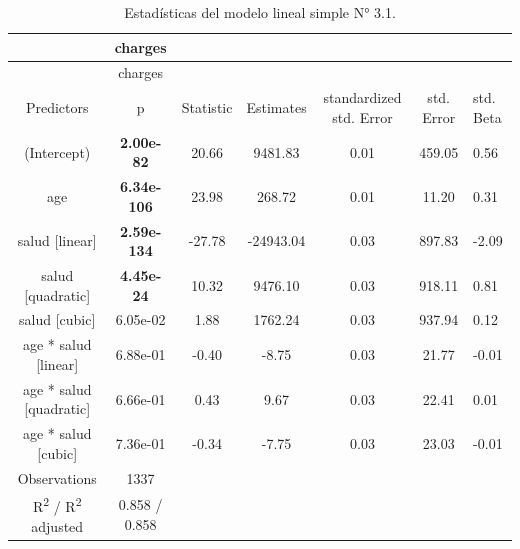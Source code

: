 \documentclass[
  letterpaper,
]{book}
\begin{document}
\hypertarget{tbl-stats_modelo3_simple}{}
\begin{longtable}[]{@{}ccccccl@{}}
\caption{\label{tbl-stats_modelo3_simple}Estadísticas del modelo lineal
simple N° 3.1.}\tabularnewline
\toprule()
~ & charges & & & & & \\
\midrule()
\endfirsthead
\toprule()
~ & charges & & & & & \\
\midrule()
\endhead
Predictors & p & Statistic & Estimates & standardized std. Error & std.
Error & std. Beta \\
(Intercept) & \textbf{2.00e-82} & 20.66 & 9481.83 & 0.01 & 459.05 &
0.56 \\
age & \textbf{6.34e-106} & 23.98 & 268.72 & 0.01 & 11.20 & 0.31 \\
salud {[}linear{]} & \textbf{2.59e-134} & -27.78 & -24943.04 & 0.03 &
897.83 & -2.09 \\
salud {[}quadratic{]} & \textbf{4.45e-24} & 10.32 & 9476.10 & 0.03 &
918.11 & 0.81 \\
salud {[}cubic{]} & 6.05e-02 & 1.88 & 1762.24 & 0.03 & 937.94 & 0.12 \\
age * salud {[}linear{]} & 6.88e-01 & -0.40 & -8.75 & 0.03 & 21.77 &
-0.01 \\
age * salud {[}quadratic{]} & 6.66e-01 & 0.43 & 9.67 & 0.03 & 22.41 &
0.01 \\
age * salud {[}cubic{]} & 7.36e-01 & -0.34 & -7.75 & 0.03 & 23.03 &
-0.01 \\
Observations & 1337 & & & & & \\
R\textsuperscript{2} / R\textsuperscript{2} adjusted & 0.858 / 0.858 & &
& & & \\
\bottomrule()
\end{longtable}
\end{document}
